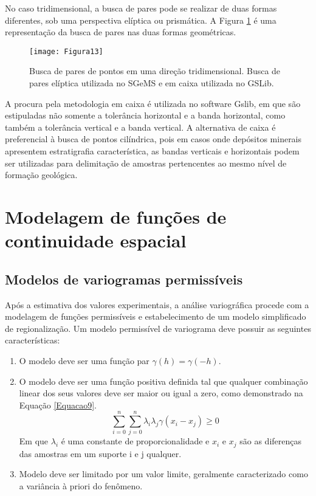 No caso tridimensional, a busca de pares pode se realizar de duas formas diferentes, sob uma perspectiva elíptica ou prismática. A Figura \ref{Figura13} é uma representação da busca de pares nas duas formas geométricas. 


\begin{figure}[H]
	\centering
	\texttt{[image: Figura13]}
	\caption{Busca de pares de pontos em uma direção tridimensional. Busca de pares elíptica utilizada no SGeMS e em caixa utilizada no GSLib.}
	\label{Figura13}
\end{figure}

A procura pela metodologia em caixa é utilizada no software Gslib, em que são estipuladas não somente a tolerância horizontal e a banda horizontal, como também a tolerância vertical e a banda vertical. A alternativa de caixa é preferencial à busca de pontos cilíndrica, pois em casos onde depósitos minerais apresentem estratigrafia característica, as bandas verticais e horizontais podem ser utilizadas para delimitação de amostras pertencentes ao mesmo nível de formação geológica. 

\section{Modelagem de funções de continuidade espacial}

\subsection{Modelos de variogramas permissíveis}

Após a estimativa dos valores experimentais, a análise variográfica procede com a modelagem de funções permissíveis e estabelecimento de um modelo simplificado de regionalização. Um modelo permissível de variograma deve possuir as seguintes características: 

\begin{enumerate}
	\item 	O modelo  deve ser uma função par $\gamma(h)= \gamma(-h)$.
	\item O modelo deve ser uma função positiva definida tal que qualquer combinação linear dos seus valores deve ser maior ou igual a zero, como demonstrado na Equação \ref{Equacao9}.
	\begin{equation}\label{Equacao9}
	\sum_{i=0}^{n}\sum_{j=0}^{n}\lambda_i\lambda_j\gamma(x_i-x_j) \geq 0
	\end{equation}
	Em que $\lambda_i$ é uma constante de proporcionalidade e $x_i$ e $x_j$ são as diferenças das amostras em um suporte i e j qualquer.
	\item Modelo deve ser limitado por um valor limite, geralmente caracterizado como a variância à priori do fenômeno.
	
\end{enumerate}

